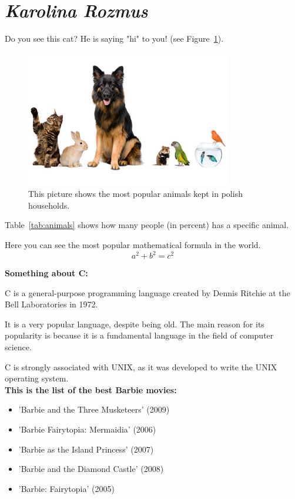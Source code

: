 \section{\textit{Karolina Rozmus}}
\label{sec:krozmus}

Do you see this cat? He is saying "hi" to you! (see Figure~\ref{fig:animals}).
\begin{figure}[H]
    \centering
    \includegraphics[width=0.8\textwidth]{pictures/pic_Krozmus.jpg} 
    \caption{This picture shows the most popular animals kept in polish households.}
    \label{fig:animals}
\end{figure}


Table~\ref{tab:animals} shows how many people (in percent) has a specific animal. 

\begin{table}[H]
    \centering
    
\end{table}


Here you can see the most popular mathematical formula in the world. \[a^2 + b^2 = c^2\]




\textbf{Something about C:\\}

C is a general-purpose programming language created by Dennis Ritchie at the Bell Laboratories in 1972.

It is a very popular language, despite being old. The main reason for its popularity is because it is a fundamental language in the field of computer science.

C is strongly associated with UNIX, as it was developed to write the UNIX operating system.
\\

\textbf{This is the list of the best Barbie movies:}

\begin{itemize}
  \item 'Barbie and the Three Musketeers' (2009)
  \item 'Barbie Fairytopia: Mermaidia' (2006)
  \item 'Barbie as the Island Princess' (2007)
  \item 'Barbie and the Diamond Castle' (2008)
  \item 'Barbie: Fairytopia' (2005)
  \end{itemize}

